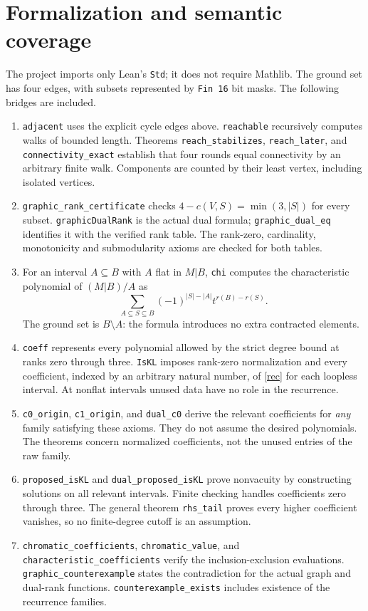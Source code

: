 \documentclass[11pt]{article}
\begin{document}
\section{Formalization and semantic coverage}
The project imports only Lean's \texttt{Std}; it does not require Mathlib. The ground set has four edges, with subsets represented by \texttt{Fin 16} bit masks. The following bridges are included.
\begin{enumerate}
\item \texttt{adjacent} uses the explicit cycle edges above. \texttt{reachable} recursively computes walks of bounded length. Theorems \texttt{reach\_stabilizes}, \texttt{reach\_later}, and \texttt{connectivity\_exact} establish that four rounds equal connectivity by an arbitrary finite walk. Components are counted by their least vertex, including isolated vertices.
\item \texttt{graphic\_rank\_certificate} checks $4-c(V,S)=\min(3,|S|)$ for every subset. \texttt{graphicDualRank} is the actual dual formula; \texttt{graphic\_dual\_eq} identifies it with the verified rank table. The rank-zero, cardinality, monotonicity and submodularity axioms are checked for both tables.
\item For an interval $A\subseteq B$ with $A$ flat in $M|B$, \texttt{chi} computes the characteristic polynomial of $(M|B)/A$ as
\[
 \sum_{A\subseteq S\subseteq B}(-1)^{|S|-|A|}t^{r(B)-r(S)}.
\]
The ground set is $B\setminus A$: the formula introduces no extra contracted elements.
\item \texttt{coeff} represents every polynomial allowed by the strict degree bound at ranks zero through three. \texttt{IsKL} imposes rank-zero normalization and every coefficient, indexed by an arbitrary natural number, of \eqref{rec} for each loopless interval. At nonflat intervals unused data have no role in the recurrence.
\item \texttt{c0\_origin}, \texttt{c1\_origin}, and \texttt{dual\_c0} derive the relevant coefficients for \emph{any} family satisfying these axioms. They do not assume the desired polynomials. The theorems concern normalized coefficients, not the unused entries of the raw family.
\item \texttt{proposed\_isKL} and \texttt{dual\_proposed\_isKL} prove nonvacuity by constructing solutions on all relevant intervals. Finite checking handles coefficients zero through three. The general theorem \texttt{rhs\_tail} proves every higher coefficient vanishes, so no finite-degree cutoff is an assumption.
\item \texttt{chromatic\_coefficients}, \texttt{chromatic\_value}, and \texttt{characteristic\_coefficients} verify the inclusion-exclusion evaluations. \texttt{graphic\_counterexample} states the contradiction for the actual graph and dual-rank functions. \texttt{counterexample\_exists} includes existence of the recurrence families.
\end{enumerate}
\end{document}
